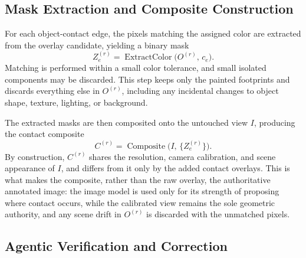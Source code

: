 \subsection{Mask Extraction and Composite Construction}
\label{sec:method-contact-composite}

For each object-contact edge, the pixels matching the assigned color are extracted from the overlay candidate, yielding a binary mask
\begin{equation}
\label{eq:color-extraction}
Z_e^{(r)} = \operatorname{ExtractColor}\bigl( O^{(r)},\, c_e \bigr).
\end{equation}
Matching is performed within a small color tolerance, and small isolated components may be discarded. This step keeps only the painted footprints and discards everything else in $O^{(r)}$, including any incidental changes to object shape, texture, lighting, or background.

The extracted masks are then composited onto the untouched view $I$, producing the contact composite
\begin{equation}
\label{eq:contact-composite}
C^{(r)} = \operatorname{Composite}\bigl( I,\, \{ Z_e^{(r)} \} \bigr).
\end{equation}
By construction, $C^{(r)}$ shares the resolution, camera calibration, and scene appearance of $I$, and differs from it only by the added contact overlays. This is what makes the composite, rather than the raw overlay, the authoritative annotated image: the image model is used only for its strength of proposing where contact occurs, while the calibrated view remains the sole geometric authority, and any scene drift in $O^{(r)}$ is discarded with the unmatched pixels.

\subsection{Agentic Verification and Correction}
\label{sec:method-agentic-contact-verification}

